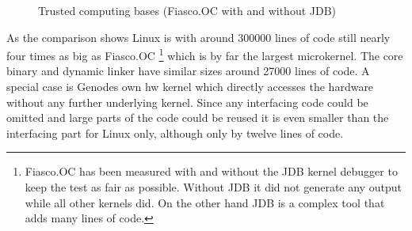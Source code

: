 \documentclass[
a4paper,
11pt,
twoside
]{report}
\begin{document}
		\begin{figure}
			\centering
                        \caption{Trusted computing bases \citep{sloccount} (Fiasco.OC with and without JDB)}
			\label{fig:tcb}
		\end{figure}
	
                As the comparison shows Linux is with around 300000 lines of code still nearly four times as big as Fiasco.OC
                \footnote{Fiasco.OC has been measured with and without the JDB kernel debugger to keep the test as fair as possible.
                Without JDB it did not generate any output while all other kernels did.
                On the other hand JDB is a complex tool that adds many lines of code.}
                which is by far the largest microkernel.
		The core binary and dynamic linker have similar sizes around 27000 lines of code.
		A special case is Genodes own hw kernel which directly accesses the hardware without any further underlying kernel.
		Since any interfacing code could be omitted and large parts of the code could be reused it is even smaller than the interfacing part for Linux only, although only by twelve lines of code.
	
\end{document}
